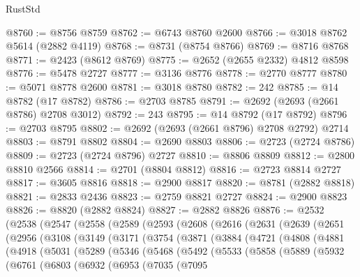 \begin{lexlean}{RustStd}
\begin{coremodule}
@8760 := @8756 @8759
@8762 := @6743 @8760 @2600
@8766 := @3018 @8762 @5614 (@2882 @4119)
@8768 := @8731 (@8754 @8766)
@8769 := @8716 @8768
@8771 := @2423 (@8612 @8769)
@8775 := @2652 (@2655 @2332) @4812 @8598
@8776 := @5478 @2727
@8777 := @3136 @8776
@8778 := @2770 @8777
@8780 := @5071 @8778 @2600
@8781 := @3018 @8780
@8782 := 242
@8785 := @14 @8782 (@17 @8782)
@8786 := @2703 @8785
@8791 := @2692 (@2693 (@2661 @8786) @2708 @3012)
@8792 := 243
@8795 := @14 @8792 (@17 @8792)
@8796 := @2703 @8795
@8802 := @2692 (@2693 (@2661 @8796) @2708 @2792) @2714
@8803 := @8791 @8802
@8804 := @2690 @8803
@8806 := @2723 (@2724 @8786)
@8809 := @2723 (@2724 @8796) @2727
@8810 := @8806 @8809
@8812 := @2800 @8810 @2566
@8814 := @2701 (@8804 @8812)
@8816 := @2723 @8814 @2727
@8817 := @3605 @8816
@8818 := @2900 @8817
@8820 := @8781 (@2882 @8818)
@8821 := @2833 @2436
@8823 := @2759 @8821 @2727
@8824 := @2900 @8823
@8826 := @8820 (@2882 @8824)
@8827 := @2882 @8826
@8876 := @2532
    (@2538
      (@2547
        (@2558
          (@2589
            (@2593
              (@2608
                (@2616
                  (@2631
                    (@2639
                      (@2651
                        (@2956
                          (@3108
                            (@3149
                              (@3171
                                (@3754
                                  (@3871
                                    (@3884
                                      (@4721
                                        (@4808
                                          (@4881
                                            (@4918
                                              (@5031
                                                (@5289
                                                  (@5346
                                                    (@5468
                                                      (@5492
                                                        (@5533
                                                          (@5858
                                                            (@5889
                                                              (@5932
                                                                (@6761
                                                                  (@6803
                                                                    (@6932
                                                                      (@6953
                                                                        (@7035
                                                                          (@7095

\end{coremodule}
\end{lexlean}
